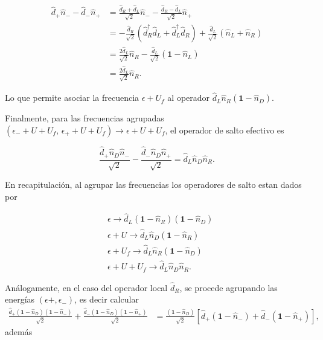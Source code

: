 \begin{appendixs}
\begin{align*}
    \hat{d}_{+}\hat{n}_{-} -\hat{d}_{-}\hat{n}_{+} & = \frac{\hat{d}_{R}+\hat{d}_{L}}{\sqrt{2}}\hat{n}_{-} - \frac{\hat{d}_{R}-\hat{d}_{L}}{\sqrt{2}}\hat{n}_{+} \\
    & = - \frac{\hat{d}_{R}}{\sqrt{2}}(\hat{d}^{\dagger}_{R}\hat{d}_{L}+ \hat{d}^{\dagger}_{L}\hat{d}_{R}) + \frac{\hat{d}_{L}}{\sqrt{2}}(\hat{n}_{L}+\hat{n}_{R}) \\
    & = \frac{2\hat{d}_{L}}{\sqrt{2}}\hat{n}_{R} - \frac{\hat{d}_{L}}{\sqrt{2}}(\textbf{1}-\hat{n}_{L}) \\
    & = \frac{2\hat{d}_{L}}{\sqrt{2}}\hat{n}_{R}.
\end{align*}

Lo que permite asociar la frecuencia $\epsilon + U_{f}$ al operador $\hat{d}_{L}\hat{n}_{R}(\mathbf{1}-\hat{n}_{D})$. 

Finalmente, para las frecuencias agrupadas $(\epsilon_{-} + U + U_{f},\, \epsilon_{+} + U + U_{f}) \to \epsilon + U + U_{f}$, el operador de salto efectivo es

\begin{equation*}
    \frac{\hat{d}_{+}\hat{n}_{D}\hat{n}_{-}}{\sqrt{2}} - \frac{\hat{d}_{-}\hat{n}_{D}\hat{n}_{+}}{\sqrt{2}} = \hat{d}_{L}\hat{n}_{D}\hat{n}_{R}.
\end{equation*}

En recapitulación, al agrupar las frecuencias los operadores de salto estan dados por 

\begin{align*}
    &\epsilon \to \hat{d}_{L}(\textbf{1}-\hat{n}_{R})(\textbf{1}-\hat{n}_{D})\\
   &\epsilon + U \to \hat{d}_{L}\hat{n}_{D}(\textbf{1}-\hat{n}_{R})\\
    &\epsilon +U_{f}\to \hat{d}_{L}\hat{n}_{R}(\textbf{1}-\hat{n}_{D})\\
    &\epsilon +U+U_{f}\to \hat{d}_{L}\hat{n}_{D}\hat{n}_{R}.
\end{align*}

Análogamente, en el caso del operador local $\hat{d}_{R}$, se procede agrupando las energías $(\epsilon{+}, \epsilon_{-})$, es decir calcular  
\begin{align*}
    \frac{\hat{d}_{+}(\textbf{1}-\hat{n}_{D})(\textbf{1}-\hat{n}_{-}) }{\sqrt{2}} + \frac{\hat{d}_{-}(\textbf{1}-\hat{n}_{D})(\textbf{1}-\hat{n}_{+}) }{\sqrt{2}} & = \frac{(\textbf{1} - \hat{n}_{D})}{\sqrt{2}}[\hat{d}_{+}(\textbf{1}-\hat{n}_{-}) + \hat{d}_{-}(\textbf{1}-\hat{n}_{+})],
\end{align*}
además  


\end{appendixs}
